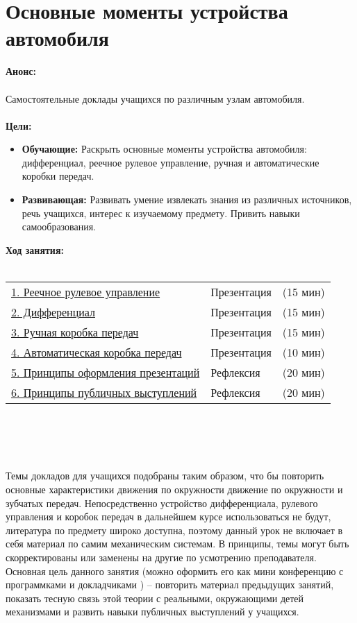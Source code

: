 \chapter{Основные моменты устройства автомобиля}
{\bfseries Анонс:}\\\\
Самостоятельные доклады учащихся по различным узлам автомобиля.\\\\
{\bfseries Цели:}
\begin{itemize}
	\item{}{\bfseries Обучающие:} Раскрыть основные моменты устройства автомобиля: дифференциал, реечное рулевое управление, ручная и автоматические коробки передач.
	\item{}{\bfseries Развивающая:} Развивать умение извлекать знания из различных источников, речь учащихся, интерес к изучаемому предмету. Привить навыки самообразования.\\
\end{itemize}	
{\bfseries Ход занятия:}\\\\
\begin{tabular}{lll}
	\hyperlink{lesson7x1}{1. Реечное рулевое управление} & Презентация & (15 мин)\\
	\hyperlink{lesson7x2}{2. Дифференциал} & Презентация & (15 мин) \\
	\hyperlink{lesson7x3}{3. Ручная коробка передач} & Презентация & (15 мин) \\
	\hyperlink{lesson7x4}{4. Автоматическая коробка передач} & Презентация & (10 мин)\\
	\hyperlink{lesson7x5}{5. Принципы оформления презентаций} & Рефлексия & (20 мин)\\
	\hyperlink{lesson7x6}{6. Принципы публичных выступлений} & Рефлексия & (20 мин)\\
\end{tabular}\\\\

{\hypertarget{lesson7x1}{\hypertarget{lesson7x2}{\hypertarget{lesson7x3}{\hypertarget{lesson7x4}{}}}}}\\\\

Темы докладов для учащихся подобраны таким образом, что бы повторить основные характеристики движения по окружности движение по окружности и зубчатых передач.  Непосредственно устройство дифференциала, рулевого управления и коробок передач в дальнейшем курсе использоваться не будут, литература по предмету широко доступна, поэтому данный урок не включает в себя материал по самим механическим системам. В принципы, темы могут быть скорректированы или заменены на другие по усмотрению преподавателя. Основная цель данного занятия (можно оформить его как мини конференцию с программками и докладчиками ) – повторить материал предыдущих занятий, показать тесную связь этой теории с реальными, окружающими детей механизмами и развить навыки публичных выступлений у учащихся.\\\\

